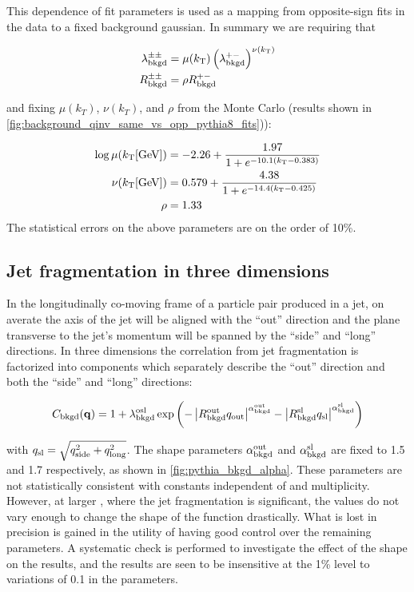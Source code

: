 This \kt dependence of fit parameters is used as a mapping from opposite-sign fits in the data to a fixed background gaussian.
In summary we are requiring that

\begin{align}
\lambda_{\mathrm{bkgd}}^{\pm\pm} &= \mu(k_\mathrm{T}) \left(\lambda_{\mathrm{bkgd}}^{+-}\right)^{\nu(k_\mathrm{T})} \label{eqn:lambdaBackPar}\\
R_{\mathrm{bkgd}}^{\pm\pm} &= \rho R_{\mathrm{bkgd}}^{+-} \label{eqn:rBackPar}
\end{align}

and fixing $\mu(k_T)$, $\nu(k_T)$, and $\rho$ from the Monte Carlo (results shown in \cref{fig:background_qinv_same_vs_opp_pythia8_fits})):

\begin{align}
\log \mu (\kt [\textrm{GeV}]) &= -2.26 + \frac{1.97}{1 + e^{-10.1 (\kt - 0.383)}} \label{eqn:mu}\\
\nu(\kt [\textrm{GeV}]) &= 0.579 + \frac{4.38}{1 + e^{-14.4 (\kt - 0.425)}} \label{eqn:nu}\\
\rho &= 1.33 \label{eqn:rho} %
\end{align}
The statistical errors on the above parameters are on the order of 10\%.


\subsection{Jet fragmentation in three dimensions}
\label{subsec:jet_frag_3d}

In the longitudinally co-moving frame of a particle pair produced in a jet, on averate the axis of the jet will be aligned with the ``out'' direction and the plane transverse to the jet's momentum will be spanned by the ``side'' and ``long'' directions. In three dimensions the correlation from jet fragmentation is factorized into components which separately describe the ``out'' direction and both the ``side'' and ``long'' directions:

\begin{align}
C_{\mathrm{bkgd}}(\mathbf{q}) = 1 + \lambda_{\mathrm{bkgd}}^\mathrm{osl} \exp\left(-\left| R_\mathrm{bkgd}^\mathrm{out} q_{\mathrm{out}} \right|^{\alpha_{\mathrm{bkgd}}^\mathrm{out}} - \left| R_\mathrm{bkgd}^\mathrm{sl} q_{\mathrm{sl}} \right|^{\alpha_{\mathrm{bkgd}}^\mathrm{sl}}\right) \label{eqn:jet_frag_form_3d}
\end{align}

with $q_{\mathrm{sl}} = \sqrt{q_{\mathrm{side}}^2 + q_{\mathrm{long}}^2}$.
The shape parameters $\alpha_{\mathrm{bkgd}}^\mathrm{out}$ and $\alpha_{\mathrm{bkgd}}^\mathrm{sl}$ are fixed to 1.5 and 1.7 respectively, as shown in \cref{fig:pythia_bkgd_alpha}.
These parameters are not statistically consistent with constants independent of \kt and multiplicity.
However, at larger \kt, where the jet fragmentation is significant, the values do not vary enough to change the shape of the function drastically.
What is lost in precision is gained in the utility of having good control over the remaining parameters.
A systematic check is performed to investigate the effect of the shape on the results, and the results are seen to be insensitive at the 1\% level to variations of 0.1 in the \abkgd parameters.


